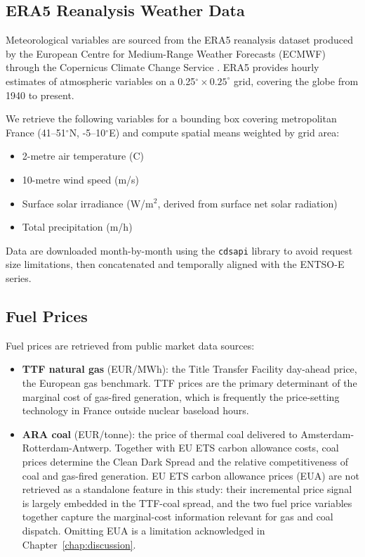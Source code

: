 \subsection{ERA5 Reanalysis Weather Data}

Meteorological variables are sourced from the ERA5 reanalysis dataset produced by the European Centre for Medium-Range Weather Forecasts (ECMWF) through the Copernicus Climate Change Service \citep{hersbach2020}. ERA5 provides hourly estimates of atmospheric variables on a 0.25$^{\circ} \times 0.25^{\circ}$ grid, covering the globe from 1940 to present.

We retrieve the following variables for a bounding box covering metropolitan France (41--51$^{\circ}$N, -5--10$^{\circ}$E) and compute spatial means weighted by grid area:

\begin{itemize}
  \item 2-metre air temperature (\textdegree C)
  \item 10-metre wind speed (m/s)
  \item Surface solar irradiance (W/m$^2$, derived from surface net solar radiation)
  \item Total precipitation (m/h)
\end{itemize}

Data are downloaded month-by-month using the \texttt{cdsapi} library to avoid request size limitations, then concatenated and temporally aligned with the ENTSO-E series.

\subsection{Fuel Prices}

Fuel prices are retrieved from public market data sources:

\begin{itemize}
  \item \textbf{TTF natural gas} (EUR/MWh): the Title Transfer Facility day-ahead price, the European gas benchmark. TTF prices are the primary determinant of the marginal cost of gas-fired generation, which is frequently the price-setting technology in France outside nuclear baseload hours.
  \item \textbf{ARA coal} (EUR/tonne): the price of thermal coal delivered to Amsterdam-Rotterdam-Antwerp. Together with EU ETS carbon allowance costs, coal prices determine the Clean Dark Spread and the relative competitiveness of coal and gas-fired generation. EU ETS carbon allowance prices (EUA) are not retrieved as a standalone feature in this study: their incremental price signal is largely embedded in the TTF-coal spread, and the two fuel price variables together capture the marginal-cost information relevant for gas and coal dispatch. Omitting EUA is a limitation acknowledged in Chapter~\ref{chap:discussion}.
\end{itemize}

